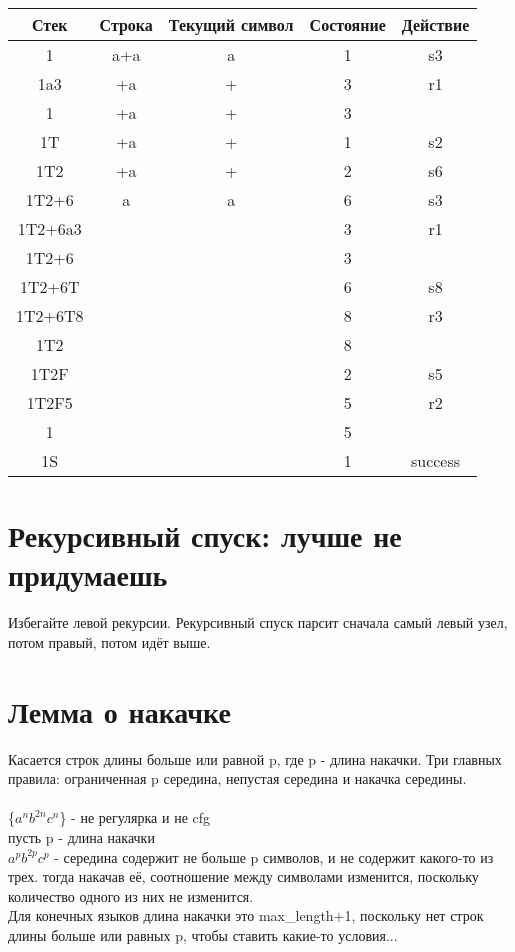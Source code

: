 \documentclass{article}
\begin{document}
\begin{center}
  \begin{tabular}{ c|c|c|c|c }
    Стек & Строка & Текущий символ & Состояние & Действие \\
    \hline
    1 & a+a & a & 1 & s3 \\
    \hline
    1a3 & +a & + & 3 & r1\\
    \hline
    1 & +a & + & 3 &  \\
    \hline
    1T & +a & + & 1 & s2 \\
    \hline 
    1T2 & +a & + & 2 & s6 \\
    \hline 
    1T2+6 & a & a & 6 & s3\\
    \hline 
    1T2+6a3 &  &  & 3 & r1\\
    \hline
    1T2+6 & &  & 3 &  \\
    \hline 
    1T2+6T &  &  & 6 & s8\\
    \hline 
    1T2+6T8 &  &  & 8 & r3 \\
    \hline
    1T2 & &  & 8 &  \\
    \hline 
    1T2F &  &  & 2 & s5 \\
    \hline 
    1T2F5 &  &  & 5 & r2 \\
    \hline 
    1 &  &  & 5 &  \\
    \hline 
    1S &  &  & 1 & success \\
  \end{tabular}
\end{center}

\part{Рекурсивный спуск: лучше не придумаешь}
Избегайте левой рекурсии. Рекурсивный спуск парсит 
сначала самый левый узел, потом правый, потом идёт выше.
\part{Лемма о накачке}
Касается строк длины больше или равной p, где p - длина накачки.
Три главных правила: ограниченная p середина, 
непустая середина и накачка середины.\\\\
\{$a^n b^{2n} c^n $\} - не регулярка и не cfg \\
пусть p - длина накачки\\
$a^p b^{2p} c^p $ - середина содержит не больше p символов,
и не содержит какого-то из трех. тогда накачав её, соотношение
между символами изменится, поскольку количество одного из них не изменится.
\\
Для конечных языков длина накачки это max\_length+1, поскольку 
нет строк длины больше или равных p, чтобы ставить какие-то условия...
\end{document}
